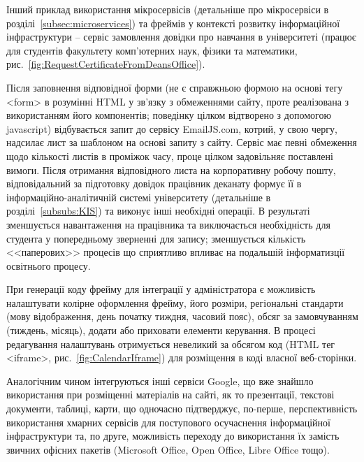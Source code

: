 Інший приклад використання мікросервісів (детальніше про мікросервіси в розділі~\ref{subsec:microservices}) та фреймів у контексті розвитку інформаційної інфраструктури  -- сервіс замовлення довідки про навчання в університеті (працює для студентів факультету комп'ютерних наук, фізики та математики, рис.~\ref{fig:RequestCertificateFromDeansOffice}).


Після заповнення відповідної форми (не є справжньою формою на основі тегу <form> в розумінні HTML у зв'язку з обмеженнями сайту, проте реалізована з використанням його компонентів; поведінку цілком відтворено з допомогою javascript) відбувається запит до сервісу EmailJS.com, котрий, у свою чергу, надсилає лист за шаблоном на основі запиту з сайту. Сервіс має певні обмеження щодо кількості листів в проміжок часу, проце цілком задовільняє поставлені вимоги. Після отримання відповідного листа на корпоративну робочу пошту, відповідальний за підготовку довідок працівник деканату формує її в інформаційно-аналітичній системі університету  (детальніше в розділі~\ref{subsubs:KIS}) та виконує інші необхідні операції. В результаті зменшується навантаження на працівника та виключається необхідність  для студента у попередньому зверненні для запису; зменшується кількість <<паперових>> процесів що сприятливо впливає на подальшій інформатизції освітнього процесу.

При генерації коду фрейму для інтеграції у адміністратора є можливість налаштувати колірне оформлення фрейму, його розміри, регіональні стандарти (мову відображення, день початку тиждня, часовий пояс), обсяг за замовчуванням (тиждень, місяць), додати або приховати елементи керування. В процесі редагування налаштувань отримується невеликий за обсягом код (HTML тег <iframe>, рис.~\ref{fig:CalendarIframe}) для розміщення в коді власної веб-сторінки. 


Аналогічним чином інтегруються інші сервіси Google, що вже знайшло використання при розміщенні матеріалів на сайті, як то презентації, текстові документи, таблиці, карти, що одночасно підтверджує, по-перше, перспективність використання хмарних сервісів для поступового осучаснення інформаційної інфраструктури та, по друге, можливість переходу до використання їх замість звичних офісних пакетів (Microsoft Office, Open Office, Libre Office тощо).

